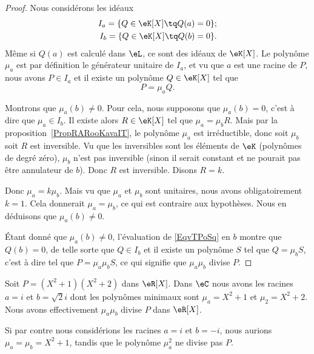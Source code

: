 \begin{proof}
    Nous considérons les idéaux
    \begin{subequations}
        \begin{align}
            I_a=\{ Q\in \eK[X]\tq Q(a)=0 \};\\
            I_b=\{ Q\in \eK[X]\tq Q(b)=0 \}.
        \end{align}
    \end{subequations}
    Même si \( Q(a)\) est calculé dans \( \eL\), ce sont des idéaux de \( \eK[X]\). Le polynôme \( \mu_a\) est par définition le générateur unitaire de \( I_a\), et vu que \( a\) est une racine de \( P\), nous avons \( P\in I_a\) et il existe un polynôme \( Q\in \eK[X]\) tel que
    \begin{equation}    \label{EqvTPoSq}
        P=\mu_aQ.
    \end{equation}

    Montrons que \( \mu_a(b)\neq 0\). Pour cela, nous  supposons que \( \mu_a(b)=0\), c'est à dire que \( \mu_a\in I_b\). Il existe alors \( R\in \eK[X]\) tel que \( \mu_a=\mu_bR\). Mais par la proposition~\ref{PropRARooKavaIT}, le polynôme \( \mu_a\) est irréductible, donc soit \( \mu_b\) soit \( R\) est inversible. Vu que les inversibles sont les éléments de \( \eK\) (polynômes de degré zéro), \( \mu_b\) n'est pas inversible (sinon il serait constant et ne pourait pas être annulateur de \( b\)). Donc \( R\) est inversible. Disons \( R=k\).

    Donc \( \mu_a=k\mu_b\). Mais vu que \( \mu_a\) et \( \mu_b\) sont unitaires, nous avons obligatoirement \( k=1\). Cela donnerait \( \mu_a=\mu_b\), ce qui est contraire aux hypothèses. Nous en déduisons que \( \mu_a(b)\neq 0\).

    Étant donné que \( \mu_a(b)\neq 0\), l'évaluation de \eqref{EqvTPoSq} en \( b\) montre que \( Q(b)=0\), de telle sorte que \( Q\in I_b\) et il existe un polynôme \( S\) tel que \( Q=\mu_bS\), c'est à dire tel que \( P=\mu_a\mu_bS\), ce qui signifie que \( \mu_a\mu_b\) divise \( P\).
\end{proof}

\begin{example}
    Soit \( P=(X^2+1)(X^2+2)\) dans \( \eR[X]\). Dans \( \eC\) nous avons les racines \( a=i\) et \( b=\sqrt{2}i\) dont les polynômes minimaux sont \( \mu_a=X^2+1\) et \( \mu_2=X^2+2\). Nous avons effectivement \( \mu_a\mu_b\) divise \( P\) dans \( \eR[X]\).

    Si par contre nous considérions les racines \( a=i\) et \( b=-i\), nous aurions \( \mu_a=\mu_b=X^2+1\), tandis que le polynôme \( \mu_a^2\) ne divise pas \( P\).
\end{example}

